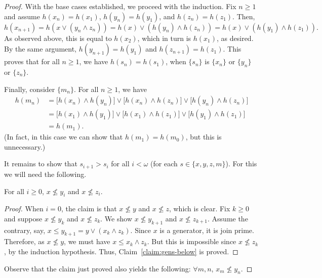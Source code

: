 \begin{proof}
With the base cases established, we proceed with the induction. 
Fix $n\geq 1$ and assume $h(x_{n}) = h(x_1)$, $h(y_{n}) = h(y_{1})$, and $h(z_{n}) = h(z_{1})$. 
  Then,
  \[h(x_{n+1}) = h(x \vee (y_n \wedge z_n))
    =h(x) \vee (h(y_n) \wedge h(z_n))= h(x) \vee (h(y_{1}) \wedge h(z_{1})).\]
As observed above, this is equal to $h(x_2)$, which in turn is 
$h(x_1)$, as desired.  By the same argument, $h(y_{n+1})=h(y_{1})$ and $h(z_{n+1})=h(z_{1})$.
This proves that for all $n \geq 1$, we have $h(s_{n})=h(s_{1})$, when 
$\{s_n\}$ is $\{x_n\}$ or $\{y_n\}$ or $\{z_n\}$.

Finally, consider $\{m_n\}$. 
For all $n\geq 1$, we have
\begin{align*}
  h(m_n) &= \bigl[h(x_n) \wedge h(y_n)\bigr] \vee \bigl[h(x_n) \wedge h(z_n)\bigr]\vee \bigl[h(y_n) \wedge h(z_n)\bigr] \\
  &= \bigl[h(x_1) \wedge h(y_1)\bigr] \vee \bigl[h(x_1) \wedge h(z_1)\bigr]\vee \bigl[h(y_1) \wedge h(z_1)\bigr]\\
  &=h(m_1).
  \end{align*}
(In fact, in this case we can show that $h(m_1) = h(m_0)$, but this is unnecessary.)


It remains to show that $s_{i+1} > s_i$ for all $i<\omega$ (for each $s \in \{x, y, z, m\}$).  
For this we will need the following.

\begin{claim}\label{claim:gens-below} For all $i \geq 0$, $x\nleq y_i$ and $x \nleq z_i$.
\end{claim}
\begin{proof}
When $i=0$, the claim is that $x\nleq y$ and $x \nleq z$, which is clear.  
Fix $k\geq 0$ and suppose $x\nleq y_k$ and $x \nleq z_k$. We show 
$x\nleq y_{k+1}$ and $x \nleq z_{k+1}$.
Assume the contrary, say, $x\leq y_{k+1} = y \vee (x_k \wedge z_k)$.
Since $x$ is a generator, it is join prime. Therefore, as $x\nleq y$, we must have
$x \leq x_k \wedge z_k$. But this is impossible since 
$x \nleq z_k$, by the induction hypothesis. Thus, Claim~\ref{claim:gens-below} is proved.
\end{proof}
Observe that the claim just proved also yields the following: $\forall m, n$, $x_m \nleq y_n$. 


\end{proof}
